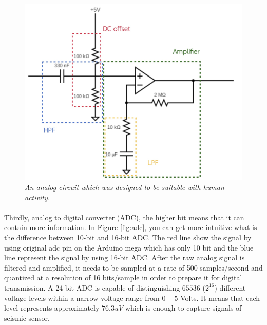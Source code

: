 \begin{figure}[H]
  \centering
  \caption[An analog circuit which was designed to be suitable with human activity]{\emph{An analog circuit which was designed to be suitable with human activity.}}\label{fig:analog_circuit}
  \includegraphics[scale = 0.3]{figures/analogcircuit.jpg}  
\end{figure}

\paragraph{}
Thirdly, analog to digital converter (ADC), the higher bit means that it can contain more information. In Figure \ref{fig:adc}, you can get more intuitive what is the difference between 10-bit and 16-bit ADC.  The red line show the signal by using original adc pin on the Arduino mega which has only 10 bit and the blue line represent the signal by using 16-bit ADC. After the raw analog signal is filtered and amplified, it needs to be sampled at a rate of 500 samples/second and quantized at a resolution of 16 bits/sample in order to prepare it for digital transmission. A 24-bit ADC is capable of distinguishing $65536$ ($2^{16}$) different voltage levels within a narrow voltage range from $0 - 5$ Volts. It means that each level represents approximately $76.3 uV$ which is enough to capture signals of seismic sensor.

